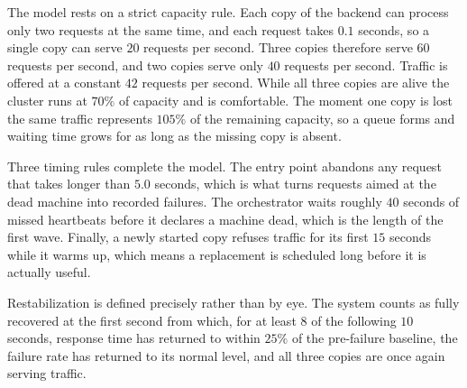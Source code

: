 The model rests on a strict capacity rule. Each copy of the backend can process
only two requests at the same time, and each request takes $0.1$ seconds, so a
single copy can serve $20$ requests per second. Three copies therefore serve
$60$ requests per second, and two copies serve only $40$ requests per second.
Traffic is offered at a constant $42$ requests per second. While all three
copies are alive the cluster runs at $70\%$ of capacity and is comfortable. The
moment one copy is lost the same traffic represents $105\%$ of the remaining
capacity, so a queue forms and waiting time grows for as long as the missing
copy is absent.

Three timing rules complete the model. The entry point abandons any request that
takes longer than $5.0$ seconds, which is what turns requests aimed at the dead
machine into recorded failures. The orchestrator waits roughly $40$ seconds of
missed heartbeats before it declares a machine dead, which is the length of the
first wave. Finally, a newly started copy refuses traffic for its first $15$
seconds while it warms up, which means a replacement is scheduled long before it
is actually useful.

Restabilization is defined precisely rather than by eye. The system counts as
fully recovered at the first second from which, for at least $8$ of the
following $10$ seconds, response time has returned to within $25\%$ of the
pre-failure baseline, the failure rate has returned to its normal level, and all
three copies are once again serving traffic.

